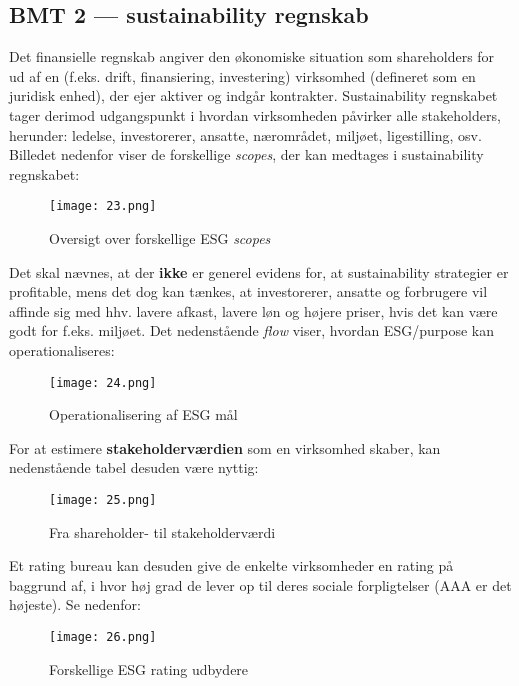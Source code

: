 \documentclass[10pt,reqno, usenames]{article}
\begin{document}
\subsection{BMT 2 — sustainability regnskab}
Det finansielle regnskab angiver den økonomiske situation som shareholders for ud af en  (f.eks. drift, finansiering, investering) virksomhed (defineret som en juridisk enhed), der ejer aktiver og indgår kontrakter. Sustainability regnskabet tager derimod udgangspunkt i hvordan virksomheden påvirker alle stakeholders, herunder: ledelse, investorerer, ansatte, nærområdet, miljøet, ligestilling, osv. Billedet nedenfor viser de forskellige \textit{scopes}, der kan medtages i sustainability regnskabet: 

\newpage
\begin{figure}[h]
     \centering
     \texttt{[image: 23.png]}
     \caption{Oversigt over forskellige ESG \textit{scopes}}
     \label{Figur 2}
\end{figure} 

Det skal nævnes, at der \textbf{ikke} er generel evidens for, at sustainability strategier er profitable, mens det dog kan tænkes, at investorerer, ansatte og forbrugere vil affinde sig med hhv. lavere afkast, lavere løn og højere priser, hvis det kan være godt for f.eks. miljøet. Det nedenstående \textit{flow} viser, hvordan ESG/purpose kan operationaliseres: 

\begin{figure}[h]
     \centering
     \texttt{[image: 24.png]}
     \caption{Operationalisering af ESG mål}
     \label{Figur 2}
\end{figure} 

For at estimere \textbf{stakeholderværdien} som en virksomhed skaber, kan nedenstående tabel desuden være nyttig: 

\begin{figure}[h]
     \centering
     \texttt{[image: 25.png]}
     \caption{Fra shareholder- til stakeholderværdi}
     \label{Figur 2}
\end{figure} 

Et rating bureau kan desuden give de enkelte virksomheder en rating på baggrund af, i hvor høj grad de lever op til deres sociale forpligtelser (AAA er det højeste). Se nedenfor: 

\newpage

\begin{figure}[h]
     \centering
     \texttt{[image: 26.png]}
     \caption{Forskellige ESG rating udbydere}
     \label{Figur 2}
\end{figure} 
\end{document}
